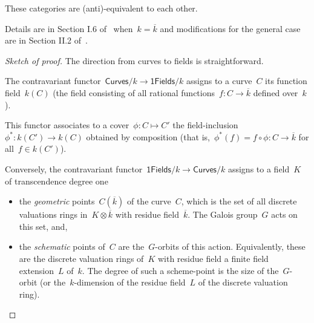 \begin{theorem}
  These categories are (anti)-equivalent to each other.

  Details are in Section I.6 of~\cite{algebraic-geometry} when~$k = \overline{k}$ and modifications for the general case are in Section II.2 of~\cite{arithmetic-of-elliptic-curves}.

  \begin{proof}[Sketch of proof]
    The direction from curves to fields is straightforward.
    
    The contravariant functor~$\mathsf{Curves}/k \longrightarrow \mathsf{1Fields}/k$ assigns to a curve~$C$ its function field~$k(C)$ (the field consisting of all rational functions~$f\colon C \rightarrow \overline{k}$ defined over~$k$).
    
    This functor associates to a cover~$\phi\colon C \mapsto C'$ the field-inclusion~$\phi^{\ast}\colon k(C') \rightarrow k(C)$ obtained by composition (that is,~$\phi^{\ast}(f) = f \circ \phi\colon C \rightarrow \overline{k}$ for all~$f \in k(C')$).
    
    Conversely, the contravariant functor~$\mathsf{1Fields}/k \longrightarrow \mathsf{Curves}/k$ assigns to a field~$K$ of transcendence degree one
    
    \begin{itemize}
      \item the \emph{geometric} points~$C(\overline{k})$ of the curve~$C$, which is the set of all discrete valuations rings in~$K \otimes \overline{k}$ with residue field~$\overline{k}$. The Galois group~$G$ acts on this set, and,
      \item the \emph{schematic} points of~$C$ are the~$G$-orbits of this action. Equivalently, these are the discrete valuation rings of~$K$ with residue field a finite field extension~$L$ of~$k$. The degree of such a scheme-point is the size of the~$G$-orbit (or the~$k$-dimension of the residue field~$L$ of the discrete valuation ring).
    \end{itemize}
  \end{proof}
\end{theorem}


